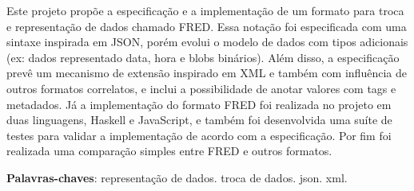 \begin{resumo}

Este projeto propõe a especificação e a implementação de um formato para
troca e representação de dados chamado FRED. Essa notação foi 
especificada com uma sintaxe inspirada em JSON, porém evolui o modelo de 
dados com tipos adicionais (ex: dados representado data, hora e blobs 
binários). Além disso, a especificação prevê um mecanismo de extensão 
inspirado em XML e também com influência de outros formatos correlatos, 
e inclui a possibilidade de anotar valores com tags e metadados.
Já a implementação do formato FRED foi realizada no projeto em duas 
linguagens, Haskell e JavaScript, e também foi desenvolvida uma suíte de 
testes para validar a implementação de acordo com a especificação. Por 
fim foi realizada uma comparação simples entre FRED e outros formatos.

 \vspace{\onelineskip}
    
 \noindent
 \textbf{Palavras-chaves}: representação de dados. troca de dados. json. xml.
\end{resumo}
